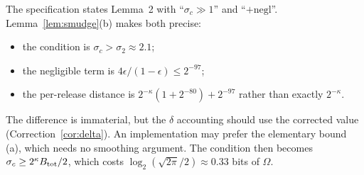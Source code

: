 \begin{remark}\label{rem:smudge}
The specification states Lemma~2 with ``$\sigma_c\gg1$'' and ``$+\mathrm{negl}$''. Lemma~\ref{lem:smudge}(b) makes both precise:
\begin{itemize}[nosep]
  \item the condition is $\sigma_c>\sigma_2\approx2.1$;
  \item the negligible term is $4\epsilon/(1-\epsilon)\le2^{-97}$;
  \item the per-release distance is $2^{-\kappa}(1+2^{-80})+2^{-97}$ rather than exactly $2^{-\kappa}$.
\end{itemize}
The difference is immaterial, but the $\delta$ accounting should use the corrected value (Correction~\ref{cor:delta}). An implementation may prefer the elementary bound (a), which needs no smoothing argument. The condition then becomes $\sigma_c\ge2^{\kappa}B_{\mathrm{tot}}/2$, which costs $\log_2(\sqrt{2\pi}/2)\approx0.33$ bits of $\Omega$.
\end{remark}
